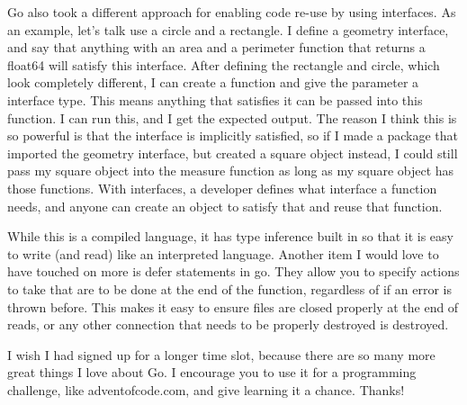 \documentclass[12pt, letterpaper]{article}
\begin{document}
\par
Go also took a different approach for enabling code re-use by using
interfaces. As an example, let's talk use a circle and a rectangle. I
define a geometry interface, and say that anything with an area and a
perimeter function that returns a float64 will satisfy this interface.
After defining the rectangle and circle, which look completely different,
I can create a function and give the parameter a interface type. This
means anything that satisfies it can be passed into this function.
I can run this, and I get the expected output. The reason I think this is
so powerful is that the interface is implicitly satisfied, so if I made
a package that imported the geometry interface, but created a square object
instead, I could still pass my square object into the measure function
as long as my square object has those functions. With interfaces,
a developer defines what interface a function needs, and anyone can create
an object to satisfy that and reuse that function.

\par
While this is a compiled language, it has type inference built in so that
it is easy to write (and read) like an interpreted language. Another
item I would love to have touched on more is defer statements in go. They
allow you to specify actions to take that are to be done at the end
of the function, regardless of if an error is thrown before. This makes
it easy to ensure files are closed properly at the end of reads, or
any other connection that needs to be properly destroyed is destroyed.

\par
I wish I had signed up for a longer time slot, because there are so many
more great things I love about Go. I encourage you to use it for a
programming challenge, like adventofcode.com, and give learning it a
chance. Thanks!
\end{document}
